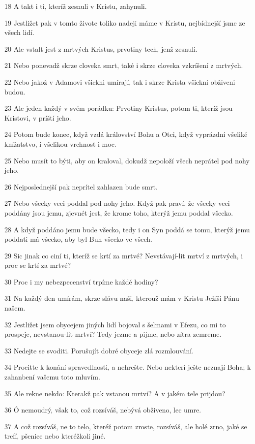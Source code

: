 \par 18 A takt i ti, kteríž zesnuli v Kristu, zahynuli.
\par 19 Jestližet pak v tomto živote toliko nadeji máme v Kristu, nejbídnejší jsme ze všech lidí.
\par 20 Ale vstalt jest z mrtvých Kristus, prvotiny tech, jenž zesnuli.
\par 21 Nebo ponevadž skrze cloveka smrt, také i skrze cloveka vzkríšení z mrtvých.
\par 22 Nebo jakož v Adamovi všickni umírají, tak i skrze Krista všickni obživeni budou.
\par 23 Ale jeden každý v svém porádku: Prvotiny Kristus, potom ti, kteríž jsou Kristovi, v príští jeho.
\par 24 Potom bude konec, když vzdá království Bohu a Otci, když vyprázdní všeliké knížatstvo, i všelikou vrchnost i moc.
\par 25 Nebo musít to býti, aby on kraloval, dokudž nepoloží všech neprátel pod nohy jeho.
\par 26 Nejposlednejší pak neprítel zahlazen bude smrt.
\par 27 Nebo všecky veci poddal pod nohy jeho. Když pak praví, že všecky veci poddány jsou jemu, zjevnét jest, že krome toho, kterýž jemu poddal všecko.
\par 28 A když poddáno jemu bude všecko, tedy i on Syn poddá se tomu, kterýž jemu poddati má všecko, aby byl Buh všecko ve všech.
\par 29 Sic jinak co ciní ti, kteríž se krtí za mrtvé? Nevstávají-lit mrtví z mrtvých, i proc se krtí za mrtvé?
\par 30 Proc i my nebezpecenství trpíme každé hodiny?
\par 31 Na každý den umírám, skrze slávu naši, kterouž mám v Kristu Ježíši Pánu našem.
\par 32 Jestližet jsem obycejem jiných lidí bojoval s šelmami v Efezu, co mi to prospeje, nevstanou-lit mrtví? Tedy jezme a pijme, nebo zítra zemreme.
\par 33 Nedejte se svoditi. Porušujít dobré obyceje zlá rozmlouvání.
\par 34 Procitte k konání spravedlnosti, a nehrešte. Nebo nekterí ješte neznají Boha; k zahanbení vašemu toto mluvím.
\par 35 Ale rekne nekdo: Kterakž pak vstanou mrtví? A v jakém tele prijdou?
\par 36 Ó nemoudrý, však to, což rozsíváš, nebývá obživeno, lec umre.
\par 37 A což rozsíváš, ne to telo, kteréž potom zroste, rozsíváš, ale holé zrno, jaké se trefí, pšenice nebo kteréžkoli jiné.
